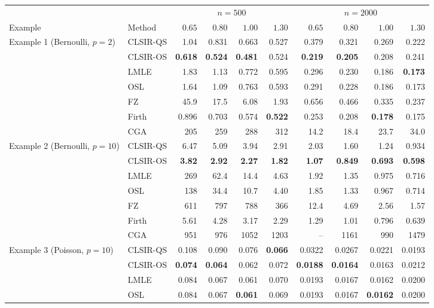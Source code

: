 \begin{tabular}{llrrrrrrrr}
\toprule
& & \multicolumn{4}{c}{$n=500$} & \multicolumn{4}{c}{$n=2000$}\\
\cmidrule(lr){3-6}\cmidrule(lr){7-10}
Example & Method & $0.65$ & $0.80$ & $1.00$ & $1.30$ & $0.65$ & $0.80$ & $1.00$ & $1.30$\\
\midrule
Example 1 (Bernoulli, $p=2$) & CLSIR-QS & 1.04 & 0.831 & 0.663 & 0.527 & 0.379 & 0.321 & 0.269 & 0.222\\
 & CLSIR-OS & \textbf{0.618} & \textbf{0.524} & \textbf{0.481} & 0.524 & \textbf{0.219} & \textbf{0.205} & 0.208 & 0.241\\
 & LMLE & 1.83 & 1.13 & 0.772 & 0.595 & 0.296 & 0.230 & 0.186 & \textbf{0.173}\\
 & OSL & 1.64 & 1.09 & 0.763 & 0.593 & 0.291 & 0.228 & 0.186 & 0.173\\
 & FZ & 45.9 & 17.5 & 6.08 & 1.93 & 0.656 & 0.466 & 0.335 & 0.237\\
 & Firth & 0.896 & 0.703 & 0.574 & \textbf{0.522} & 0.253 & 0.208 & \textbf{0.178} & 0.175\\
 & CGA & 205 & 259 & 288 & 312 & 14.2 & 18.4 & 23.7 & 34.0\\
\addlinespace
Example 2 (Bernoulli, $p=10$) & CLSIR-QS & 6.47 & 5.09 & 3.94 & 2.91 & 2.03 & 1.60 & 1.24 & 0.934\\
 & CLSIR-OS & \textbf{3.82} & \textbf{2.92} & \textbf{2.27} & \textbf{1.82} & \textbf{1.07} & \textbf{0.849} & \textbf{0.693} & \textbf{0.598}\\
 & LMLE & 269 & 62.4 & 14.4 & 4.63 & 1.92 & 1.35 & 0.975 & 0.716\\
 & OSL & 138 & 34.4 & 10.7 & 4.40 & 1.85 & 1.33 & 0.967 & 0.714\\
 & FZ & 611 & 797 & 788 & 366 & 12.4 & 4.69 & 2.56 & 1.57\\
 & Firth & 5.61 & 4.28 & 3.17 & 2.29 & 1.29 & 1.01 & 0.796 & 0.639\\
 & CGA & 951 & 976 & 1052 & 1203 & -- & 1161 & 990 & 1479\\
\addlinespace
Example 3 (Poisson, $p=10$) & CLSIR-QS & 0.108 & 0.090 & 0.076 & \textbf{0.066} & 0.0322 & 0.0267 & 0.0221 & 0.0193\\
 & CLSIR-OS & \textbf{0.074} & \textbf{0.064} & 0.062 & 0.072 & \textbf{0.0188} & \textbf{0.0164} & 0.0163 & 0.0212\\
 & LMLE & 0.084 & 0.067 & 0.061 & 0.070 & 0.0193 & 0.0167 & 0.0162 & 0.0200\\
 & OSL & 0.084 & 0.067 & \textbf{0.061} & 0.069 & 0.0193 & 0.0167 & \textbf{0.0162} & 0.0200\\

\end{tabular}
